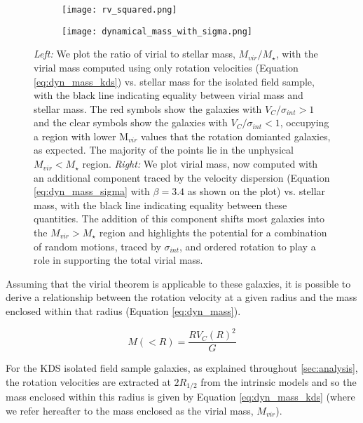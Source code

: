 \documentclass[a4paper,fleqn,usenatbib]{mn2e}
\begin{document}
\begin{figure*}
    \centering \hspace{-1.3cm}
    \begin{subfigure}[h!]{0.5\textwidth}
        \centering
        \texttt{[image: rv\_squared.png]}
    \end{subfigure} \hspace{+0.4cm}
    \begin{subfigure}[h!]{0.5\textwidth}
        \centering
        \texttt{[image: dynamical\_mass\_with\_sigma.png]}
    \end{subfigure}
    \caption{{\it Left:} We plot the ratio of virial to stellar mass, $M_{vir}/M_{\star}$, with the virial mass computed using only rotation velocities (Equation \protect\ref{eq:dyn_mass_kds}) vs. stellar mass for the isolated field sample, with the black line indicating equality between virial mass and stellar mass.
    The red symbols show the galaxies with $V_{C}/\sigma_{int} > 1$ and the clear symbols show the galaxies with $V_{C}/\sigma_{int} < 1$, occupying a region with lower M$_{vir}$ values that the rotation domianted galaxies, as expected.
    The majority of the points lie in the unphysical $M_{vir} < M_{\star}$ region.
    {\it Right:} We plot virial mass, now computed with an additional component traced by the velocity dispersion (Equation \protect\ref{eq:dyn_mass_sigma} with $\beta=3.4$ as shown on the plot) vs. stellar mass, with the black line indicating equality between these quantities.
    The addition of this component shifts most galaxies into the $M_{vir} > M_{\star}$ region and highlights the potential for a combination of random motions, traced by $\sigma_{int}$, and ordered rotation to play a role in supporting the total virial mass.}
    \label{fig:dyn_masses}
\end{figure*}

Assuming that the virial theorem is applicable to these galaxies, it is possible to derive a relationship between the rotation velocity at a given radius and the mass enclosed within that radius (Equation \ref{eq:dyn_mass}). 

\begin{equation}\label{eq:dyn_mass}
   M\left(<R\right) = \frac{RV_{C}(R)^{2}}{G}
\end{equation}

For the KDS isolated field sample galaxies, as explained throughout \cref{sec:analysis}, the rotation velocities are extracted at $2R_{1/2}$ from the intrinsic models and so the mass enclosed within this radius is given by Equation \ref{eq:dyn_mass_kds} (where we refer hereafter to the mass enclosed as the virial mass, $M_{vir}$). 
\end{document}
